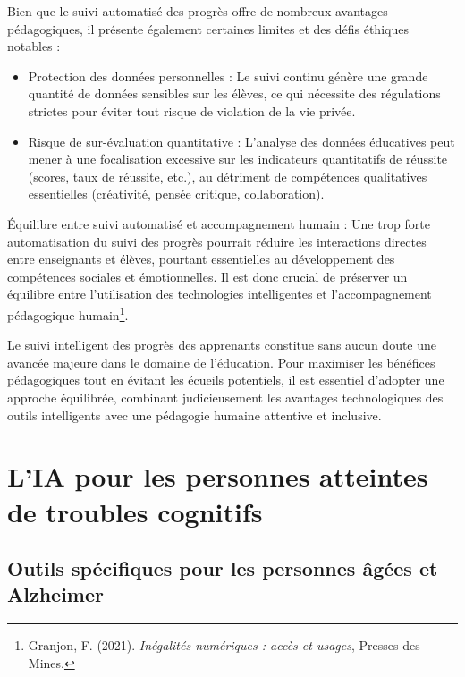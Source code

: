 \documentclass[12pt,a4paper]{report}
\begin{document}
Bien que le suivi automatisé des progrès offre de nombreux avantages pédagogiques, il présente également certaines limites et des défis éthiques notables :

\begin{itemize}

    \item Protection des données personnelles : Le suivi continu génère une grande quantité de données sensibles sur les élèves, ce qui nécessite des régulations strictes pour éviter tout risque de violation de la vie privée.

    \item Risque de sur-évaluation quantitative : L’analyse des données éducatives peut mener à une focalisation excessive sur les indicateurs quantitatifs de réussite (scores, taux de réussite, etc.), au détriment de compétences qualitatives essentielles (créativité, pensée critique, collaboration).
 
\end{itemize}

Équilibre entre suivi automatisé et accompagnement humain : Une trop forte automatisation du suivi des progrès pourrait réduire les interactions directes entre enseignants et élèves, pourtant essentielles au développement des compétences sociales et émotionnelles. Il est donc crucial de préserver un équilibre entre l’utilisation des technologies intelligentes et l’accompagnement pédagogique humain\footnote{Granjon, F. (2021). \textit{Inégalités numériques : accès et usages}, Presses des Mines.}.

Le suivi intelligent des progrès des apprenants constitue sans aucun doute une avancée majeure dans le domaine de l’éducation. Pour maximiser les bénéfices pédagogiques tout en évitant les écueils potentiels, il est essentiel d’adopter une approche équilibrée, combinant judicieusement les avantages technologiques des outils intelligents avec une pédagogie humaine attentive et inclusive.

\section{L’IA pour les personnes atteintes de troubles cognitifs}

\subsection{Outils spécifiques pour les personnes âgées et Alzheimer}
\end{document}
